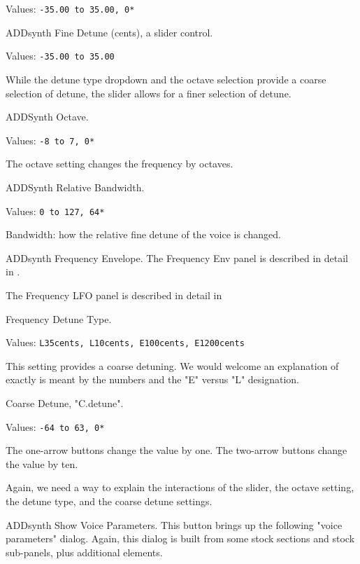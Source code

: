    Values: \texttt{-35.00 to 35.00, 0*}

   ADDsynth Fine Detune (cents), a slider control.

   Values: \texttt{-35.00 to 35.00}

   While the detune type dropdown and the octave selection provide a coarse
   selection of detune, the slider allows for a finer selection of detune.

   ADDSynth Octave.

   Values: \texttt{-8 to 7, 0*}

   The octave setting changes the frequency by octaves.

   ADDSynth Relative Bandwidth.

   Values: \texttt{0 to 127, 64*}

   Bandwidth: how the relative fine detune of the voice is changed.

   ADDsynth Frequency Envelope.
   The Frequency Env panel is described in detail in
   .

   The Frequency LFO panel is described in detail in

   Frequency Detune Type.

   Values: \texttt{L35cents, L10cents, E100cents, E1200cents}

   This setting provides a coarse detuning.
   We would welcome an explanation of exactly is meant by the numbers and
   the "E" versus "L" designation.

   Coarse Detune, "C.detune".

   Values: \texttt{-64 to 63, 0*}

   The one-arrow buttons change the value by one.
   The two-arrow buttons change the value by ten.

   Again, we need a way to explain the interactions of the slider, the
   octave setting, the detune type, and the coarse detune settings.

   ADDsynth Show Voice Parameters.
   This button brings up the following "voice parameters" dialog.
   Again, this dialog is built from some stock sections and stock
   sub-panels, plus additional elements.

